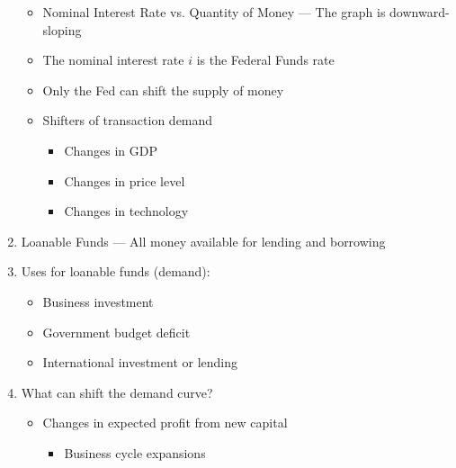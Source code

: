 \documentclass[12pt]{article}
\begin{document}
\begin{enumerate}
\begin{itemize}
      \item Nominal Interest Rate vs. Quantity of Money — The graph is downward-sloping

      \item The nominal interest rate $i$ is the Federal Funds rate

      \item Only the Fed can shift the supply of money

      \item Shifters of transaction demand

        \begin{itemize}

          \item Changes in GDP

          \item Changes in price level

          \item Changes in technology

        \end{itemize}

    \end{itemize}

  \item Loanable Funds — All money available for lending and borrowing

  \item Uses for loanable funds (demand):

    \begin{itemize}

      \item Business investment

      \item Government budget deficit

      \item International investment or lending

    \end{itemize}

  \item What can shift the demand curve?

    \begin{itemize}

      \item Changes in expected profit from new capital

        \begin{itemize}

          \item Business cycle expansions


\end{itemize}
\end{itemize}
\end{enumerate}
\end{document}
